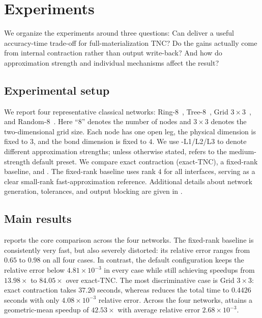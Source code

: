 \section{Experiments}

We organize the experiments around three questions: Can \method{} deliver a useful accuracy-time trade-off for full-materialization TNC? Do the gains actually come from internal contraction rather than output write-back? And how do approximation strength and individual mechanisms affect the result?

\subsection{Experimental setup}

We report four representative classical networks: Ring-8~\cite{bondy2008graph}, Tree-8~\cite{diestel2017graph}, Grid $3\times 3$~\cite{levin2007trg,orus2014practical}, and Random-8~\cite{erdos1959random,gilbert1959random}. Here ``8'' denotes the number of nodes and $3\times 3$ denotes the two-dimensional grid size. Each node has one open leg, the physical dimension is fixed to $3$, and the bond dimension is fixed to $4$. We use \textsf{\method-L1/L2/L3} to denote different approximation strengths; unless otherwise stated, \textsf{\method} refers to the medium-strength default preset. We compare exact contraction (\textsf{exact-TNC}), a fixed-rank baseline, and \method{}. The fixed-rank baseline uses rank $4$ for all interfaces, serving as a clear small-rank fast-approximation reference. Additional details about network generation, tolerances, and output blocking are given in .

\subsection{Main results}

 reports the core comparison across the four networks. The fixed-rank baseline is consistently very fast, but also severely distorted: its relative error ranges from $0.65$ to $0.98$ on all four cases. In contrast, the default \method{} configuration keeps the relative error below $4.81\times 10^{-3}$ in every case while still achieving speedups from $13.98\times$ to $84.05\times$ over \textsf{exact-TNC}. The most discriminative case is Grid $3\times 3$: exact contraction takes $37.20$ seconds, whereas \method{} reduces the total time to $0.4426$ seconds with only $4.08\times 10^{-3}$ relative error. Across the four networks, \method{} attains a geometric-mean speedup of $42.53\times$ with average relative error $2.68\times 10^{-3}$.

